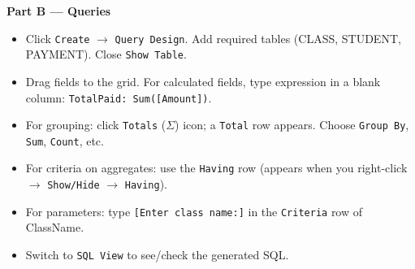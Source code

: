 \documentclass[11pt]{article}
\begin{document}
\textbf{Part B — Queries}

\begin{methode}
\begin{itemize}
\item Click \texttt{Create} $\rightarrow$ \texttt{Query Design}. Add required tables (CLASS, STUDENT, PAYMENT). Close \texttt{Show Table}.
\item Drag fields to the grid. For calculated fields, type expression in a blank column: \texttt{TotalPaid: Sum([Amount])}.
\item For grouping: click \texttt{Totals} ($\Sigma$) icon; a \texttt{Total} row appears. Choose \texttt{Group By}, \texttt{Sum}, \texttt{Count}, etc.
\item For criteria on aggregates: use the \texttt{Having} row (appears when you right-click $\rightarrow$ \texttt{Show/Hide} $\rightarrow$ \texttt{Having}).
\item For parameters: type \texttt{[Enter class name:]} in the \texttt{Criteria} row of ClassName.
\item Switch to \texttt{SQL View} to see/check the generated SQL.
\end{itemize}
\end{methode}
\end{document}
